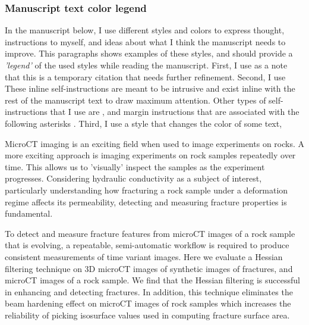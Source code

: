 \documentclass{edger}
\begin{document}
\subsubsection*{Manuscript text color legend}
In the manuscript below, I use different styles and colors to express thought, instructions to myself, and ideas about what I think the manuscript needs to improve. This paragraphs shows examples of these styles, and should provide a \emph{'legend'} of the used styles while reading the manuscript. First, I use  as a note that this is a temporary citation that needs further refinement. Second, I use  These inline self-instructions are meant to be intrusive and exist inline with the rest of the manuscript text to draw maximum attention. Other types of self-instructions that I use are , and margin instructions that are associated with the following asterisks . Third, I use a style that changes the color of some text, 
\pagebreak
\thispagestyle{plain} %

\institution{}

\begin{edgerabstract}
MicroCT imaging is an exciting field when used to image experiments on rocks. A more exciting approach is imaging experiments on rock samples repeatedly over time. This allows us to 'visually' inspect the samples as the experiment progresses. Considering hydraulic conductivity as a subject of interest, particularly understanding how fracturing a rock sample under a deformation regime affects its permeability, detecting and measuring fracture properties is fundamental.

To detect and measure fracture features from microCT images of a rock sample that is evolving, a repeatable, semi-automatic workflow is required to produce consistent measurements of time variant images. Here we evaluate a Hessian filtering technique on 3D microCT images of synthetic images of fractures, and microCT images of a rock sample. We find that the Hessian filtering is successful in enhancing and detecting fractures. In addition, this technique eliminates the beam hardening effect on microCT images of rock samples which increases the reliability of picking isosurface values used in computing fracture surface area. 
\end{edgerabstract}
\end{document}
